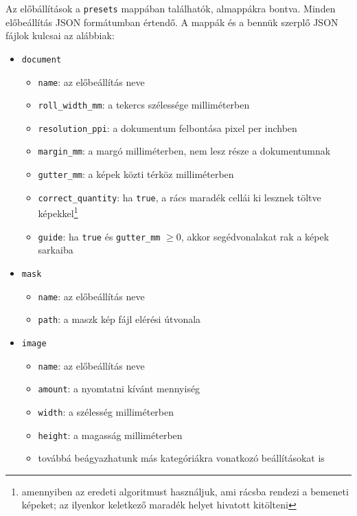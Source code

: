 Az előbállítások a \texttt{presets} mappában találhatók, almappákra bontva. Minden előbeállítás JSON formátumban értendő. A mappák és a bennük szerplő JSON fájlok kulcsai az alábbiak:
\begin{itemize}
    \item \texttt{document}
    \begin{itemize}
        \item \texttt{name}: az előbeállítás neve
        \item \texttt{roll\_width\_mm}: a tekercs szélessége milliméterben
        \item \texttt{resolution\_ppi}: a dokumentum felbontása pixel per inchben
        \item \texttt{margin\_mm}: a margó milliméterben, nem lesz része a dokumentumnak
        \item \texttt{gutter\_mm}: a képek közti térköz milliméterben
        \item \texttt{correct\_quantity}: ha \texttt{true}, a rács maradék cellái ki lesznek töltve képekkel\footnote{amennyiben az eredeti algoritmust használjuk, ami rácsba rendezi a bemeneti képeket; az ilyenkor keletkező maradék helyet hivatott kitölteni}
        \item \texttt{guide}: ha \texttt{true} és \texttt{gutter\_mm} \begin{math}
            \geq 0
        \end{math}, akkor segédvonalakat rak a képek sarkaiba
    \end{itemize}

    \item \texttt{mask}
    \begin{itemize}
        \item \texttt{name}: az előbeállítás neve
        \item \texttt{path}: a maszk kép fájl elérési útvonala
    \end{itemize}

    \item \texttt{image}
    \begin{itemize}
        \item \texttt{name}: az előbeállítás neve
        \item \texttt{amount}: a nyomtatni kívánt mennyiség
        \item \texttt{width}: a szélesség milliméterben
        \item \texttt{height}: a magasság milliméterben
        \item továbbá beágyazhatunk más kategóriákra vonatkozó beállításokat is
    \end{itemize}
\end{itemize}
